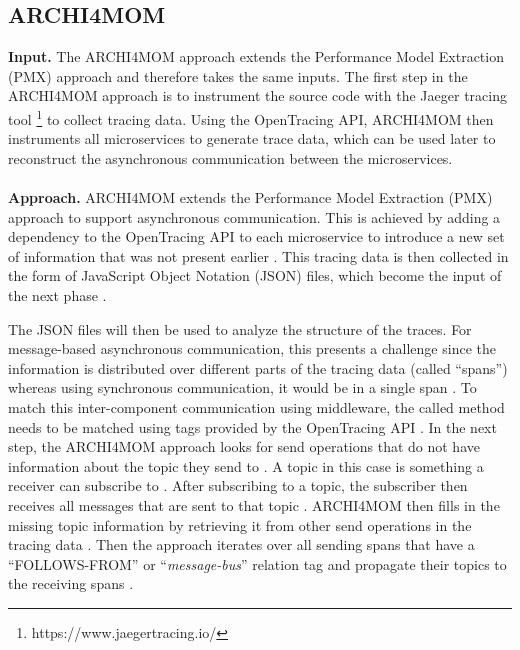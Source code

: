 \subsection{ARCHI4MOM}
\label{sec:Results:ARCHI4MOM}
\textbf{Input.}
The ARCHI4MOM approach extends the Performance Model Extraction (PMX) approach \cite{Walter2017PMX,Singh2022ARCHI4MOM} and therefore takes the same inputs.
The first step in the ARCHI4MOM approach is to instrument the source code with the Jaeger tracing tool \footnote{https://www.jaegertracing.io/} to collect tracing data.
Using the OpenTracing API, ARCHI4MOM then instruments all microservices to generate trace data, which can be used later to reconstruct the asynchronous communication between the microservices. \cite{Singh2022ARCHI4MOM}
\\ \\
\textbf{Approach.}
ARCHI4MOM extends the Performance Model Extraction (PMX) approach \cite{Walter2017PMX,Singh2022ARCHI4MOM} to support asynchronous communication.
This is achieved by adding a dependency to the OpenTracing API to each microservice to introduce a new set of information that was not present earlier \cite{Singh2022ARCHI4MOM}.
This tracing data is then collected in the form of JavaScript Object Notation (JSON) files, which become the input of the next phase \cite{Singh2022ARCHI4MOM}.

The JSON files will then be used to analyze the structure of the traces.
For message-based asynchronous communication, this presents a challenge since the information is distributed over different parts of the tracing data (called ``spans'') whereas using synchronous communication, it would be in a single span \cite{Singh2022ARCHI4MOM}.
To match this inter-component communication using middleware, the called method needs to be matched using tags provided by the OpenTracing API \cite{Singh2022ARCHI4MOM}.
In the next step, the ARCHI4MOM approach looks for send operations that do not have information about the topic they send to \cite{Singh2022ARCHI4MOM}.
A topic in this case is something a receiver can subscribe to \cite{Singh2022ARCHI4MOM}.
After subscribing to a topic, the subscriber then receives all messages that are sent to that topic \cite{Singh2022ARCHI4MOM}.
ARCHI4MOM then fills in the missing topic information by retrieving it from other send operations in the tracing data \cite{Singh2022ARCHI4MOM}.
Then the approach iterates over all sending spans that have a ``FOLLOWS-FROM'' or ``\textit{message-bus}'' relation tag and propagate their topics to the receiving spans \cite{Singh2022ARCHI4MOM}.

